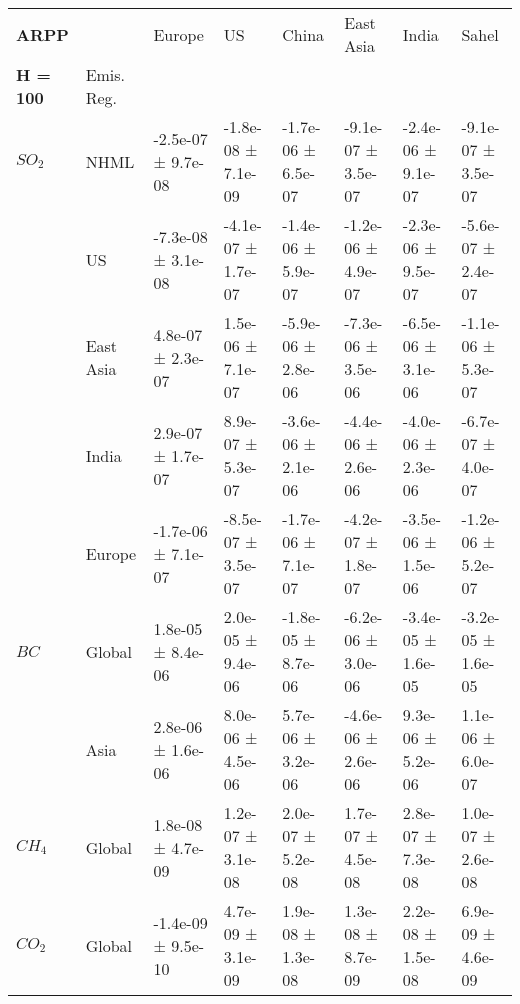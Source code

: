 \documentclass[preview]{standalone}
\newcommand{\nm}{\phantom{-}}
\begin{document}
	\tiny
	\begin{minipage}{\textwidth}
		\setlength\tabcolsep{5pt}
		\begin{tabular}{llllllll}
			\toprule
			\textbf{ARPP}       &        &               Europe &                   US &                China &            East Asia &                India &                Sahel \\
			\textbf{H = 100} & Emis. Reg. &                      &                      &                      &                      &                      &                      \\
			\midrule
$SO_2$ & NHML &  -2.5e-07 ±  9.7e-08 &  -1.8e-08 ±  7.1e-09 &  -1.7e-06 ±  6.5e-07 &  -9.1e-07 ±  3.5e-07 &  -2.4e-06 ±  9.1e-07 &  -9.1e-07 ±  3.5e-07 \\
       & US &  -7.3e-08 ±  3.1e-08 &  -4.1e-07 ±  1.7e-07 &  -1.4e-06 ±  5.9e-07 &  -1.2e-06 ±  4.9e-07 &  -2.3e-06 ±  9.5e-07 &  -5.6e-07 ±  2.4e-07 \\
       & East Asia &   \nm4.8e-07 ±  2.3e-07 &   \nm1.5e-06 ±  7.1e-07 &  -5.9e-06 ±  2.8e-06 &  -7.3e-06 ±  3.5e-06 &  -6.5e-06 ±  3.1e-06 &  -1.1e-06 ±  5.3e-07 \\
       & India &   \nm2.9e-07 ±  1.7e-07 &   \nm8.9e-07 ±  5.3e-07 &  -3.6e-06 ±  2.1e-06 &  -4.4e-06 ±  2.6e-06 &  -4.0e-06 ±  2.3e-06 &  -6.7e-07 ±  4.0e-07 \\
       & Europe &  -1.7e-06 ±  7.1e-07 &  -8.5e-07 ±  3.5e-07 &  -1.7e-06 ±  7.1e-07 &  -4.2e-07 ±  1.8e-07 &  -3.5e-06 ±  1.5e-06 &  -1.2e-06 ±  5.2e-07 \\
\cmidrule(lr){1-8}
$BC$ & Global &   \nm1.8e-05 ±  8.4e-06 &   \nm2.0e-05 ±  9.4e-06 &  -1.8e-05 ±  8.7e-06 &  -6.2e-06 ±  3.0e-06 &  -3.4e-05 ±  1.6e-05 &  -3.2e-05 ±  1.6e-05 \\
       & Asia &   \nm2.8e-06 ±  1.6e-06 &   \nm8.0e-06 ±  4.5e-06 &   \nm5.7e-06 ±  3.2e-06 &  -4.6e-06 ±  2.6e-06 &   \nm9.3e-06 ±  5.2e-06 &   \nm1.1e-06 ±  6.0e-07 \\
\cmidrule(lr){1-8}
$CH_4$ & Global &   \nm1.8e-08 ±  4.7e-09 &   \nm1.2e-07 ±  3.1e-08 &   \nm2.0e-07 ±  5.2e-08 &   \nm1.7e-07 ±  4.5e-08 &   \nm2.8e-07 ±  7.3e-08 &   \nm1.0e-07 ±  2.6e-08 \\
\cmidrule(lr){1-8}
$CO_2$ & Global &  -1.4e-09 ±  9.5e-10 &   \nm4.7e-09 ±  3.1e-09 &   \nm1.9e-08 ±  1.3e-08 &   \nm1.3e-08 ±  8.7e-09 &   \nm2.2e-08 ±  1.5e-08 &   \nm6.9e-09 ±  4.6e-09 \\
\bottomrule
\end{tabular}

        \end{minipage}
        
\end{document}

